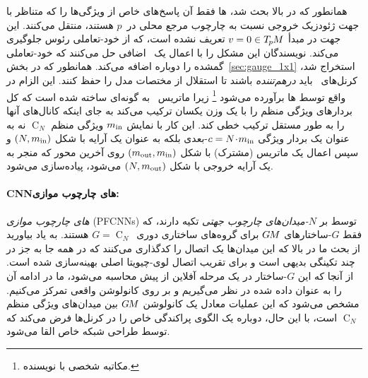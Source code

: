 همانطور که در بالا بحث شد، ها فقط آن پاسخ‌های خاص از ویژگی‌ها را که متناظر با جهت ژئودزیک خروجی نسبت به چارچوب مرجع محلی در~$p$ هستند، منتقل می‌کنند.
این جهت در مبدأ $v=0 \in T_{\mkern-1.5mu p}\mkern-.5muM$ تعریف نشده است، که از خود-تعاملی رئوس جلوگیری می‌کند.
نویسندگان این مشکل را با اعمال یک \onexone\ اضافی حل می‌کنند که خود-تعاملی گمشده را دوباره اضافه می‌کند.
همانطور که در بخش~\ref{sec:gauge_1x1} استخراج شد، کرنل‌های \onexone\ باید \emph{درهم‌تننده} باشند تا استقلال از مختصات مدل را حفظ کنند.
این الزام در واقع توسط ها برآورده می‌شود%
\footnote{
    مکاتبه شخصی با نویسنده.
}
زیرا ماتریس \onexone\ به گونه‌ای ساخته شده است که کل بردارهای ویژگی منظم را با یک وزن یکسان ترکیب می‌کند به جای اینکه کانال‌های آنها را به طور مستقل ترکیب خطی کند.
این کار با نمایش $m_\textup{in}$ ویژگی منظم $\operatorname{C}_N$ نه به عنوان یک بردار ویژگی ${c=N \!\cdot\! m_\textup{in}}$-بعدی بلکه به عنوان یک آرایه با شکل $(N,m_\textup{in})$ و سپس اعمال یک ماتریس (مشترک) با شکل $(m_\textup{out},m_\textup{in})$ روی آخرین محور که منجر به یک آرایه خروجی با شکل $(N,m_\textup{out})$ می‌شود، پیاده‌سازی می‌شود.








\paragraph{CNNهای چارچوب موازی:}
\emph{های چارچوب موازی} (PFCNNs) توسط \citet{Yang2020parallelFrameCNN} بر \emph{$N$-میدان‌های چارچوب جهتی} تکیه دارند، که فقط $G$-ساختارهای $G\mkern-1.4muM$ برای گروه‌های ساختاری دوری~$G=\operatorname{C}_N$ هستند.
به یاد بیاورید از بحث ما در بالا که این میدان‌ها یک اتصال را کدگذاری می‌کنند که در همه جا به جز در چند تکینگی بدیهی است و برای تقریب اتصال لوی-چیویتا اصلی بهینه‌سازی شده است.
از آنجا که این $G$-ساختار در یک مرحله آفلاین از پیش محاسبه می‌شود، ما در ادامه آن را به عنوان داده شده در نظر می‌گیریم و بر روی کانولوشن واقعی  تمرکز می‌کنیم.
مشخص می‌شود که این عملیات معادل یک کانولوشن $G\mkern-1.4muM$ بین میدان‌های ویژگی منظم $\operatorname{C}_N$ است، با این حال، دوباره یک الگوی پراکندگی خاص را در کرنل‌ها فرض می‌کند که توسط طراحی شبکه خاص القا می‌شود.

